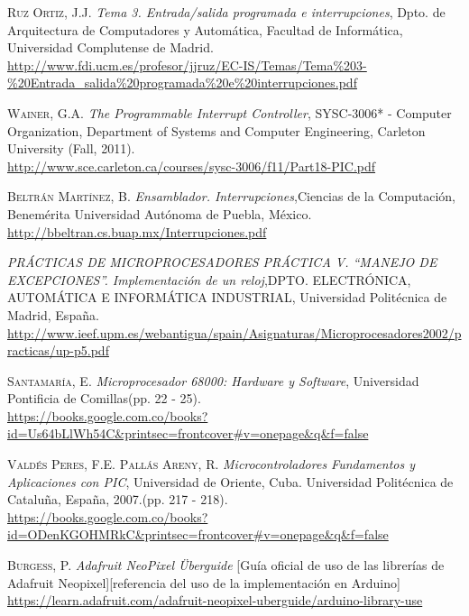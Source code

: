 \documentclass[12pt]{article}
\begin{document}
\begin{thebibliography}{x}
 \textsc{Ruz Ortiz, J.J.}
\textit{Tema 3. Entrada/salida programada e interrupciones}, Dpto. de Arquitectura de Computadores y Automática, Facultad de Informática,  Universidad Complutense de Madrid.\\\url{http://www.fdi.ucm.es/profesor/jjruz/EC-IS/Temas/Tema%203-%20Entrada_salida%20programada%20e%20interrupciones.pdf}

 \textsc{Wainer, G.A.}
\textit{The Programmable Interrupt Controller}, SYSC-3006* - Computer Organization, Department of Systems and Computer Engineering, Carleton University (Fall, 2011). \\\url{http://www.sce.carleton.ca/courses/sysc-3006/f11/Part18-PIC.pdf}

 \textsc{Beltrán Martínez, B.}
\textit{Ensamblador. Interrupciones},Ciencias de la Computación, Benemérita Universidad Autónoma de Puebla, México. \\\url{http://bbeltran.cs.buap.mx/Interrupciones.pdf}

\textit{PRÁCTICAS DE MICROPROCESADORES PRÁCTICA V. “MANEJO DE EXCEPCIONES”. Implementación de un reloj},DPTO. ELECTRÓNICA, AUTOMÁTICA E INFORMÁTICA INDUSTRIAL, Universidad Politécnica de Madrid, España. \\\url{http://www.ieef.upm.es/webantigua/spain/Asignaturas/Microprocesadores2002/practicas/up-p5.pdf}

 \textsc{Santamaría, E.}
\textit{Microprocesador 68000: Hardware y Software}, Universidad Pontificia de Comillas(pp. 22 - 25). \\\url{https://books.google.com.co/books?id=Us64bLlWh54C&printsec=frontcover#v=onepage&q&f=false}

 \textsc{Valdés Peres, F.E. Pallás Areny, R.}
\textit{Microcontroladores Fundamentos y Aplicaciones con PIC}, Universidad de Oriente, Cuba. Universidad Politécnica de Cataluña, España, 2007.(pp. 217 - 218). \\\url{https://books.google.com.co/books?id=ODenKGOHMRkC&printsec=frontcover#v=onepage&q&f=false}

 \textsc{Burgess, P.}
\textit{Adafruit NeoPixel Überguide} [Guía oficial de uso de las librerías de Adafruit Neopixel][referencia del uso de la implementación en Arduino]\\\url{https://learn.adafruit.com/adafruit-neopixel-uberguide/arduino-library-use}

\end{thebibliography}
\end{document}
